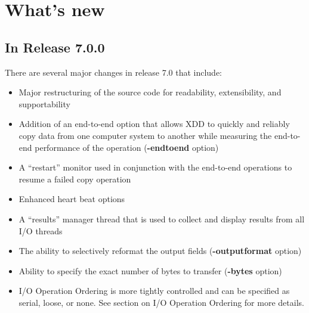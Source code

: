 \newpage
\section{\texorpdfstring{What's new }{What's new }}\label{whats-new}

\subsection{In Release 7.0.0}\label{in-release-7.0.0}

There are several major changes in release 7.0 that include:

\begin{itemize}
\item
  Major restructuring of the source code for readability, extensibility, and supportability
\item
  Addition of an end-to-end option that allows XDD to quickly and reliably copy data from one computer system to another while measuring the end-to-end performance of the operation (\textbf{-endtoend} option)
\item
  A ``restart'' monitor used in conjunction with the end-to-end operations to resume a failed copy operation
\item
  Enhanced heart beat options
\item
  A ``results'' manager thread that is used to collect and display results from all I/O threads
\item
  The ability to selectively reformat the output fields (\textbf{-outputformat} option)
\item
  Ability to specify the exact number of bytes to transfer (\textbf{-bytes} option)
\item
  I/O Operation Ordering is more tightly controlled and can be specified as serial, loose, or none. See section on I/O Operation Ordering for more details.
\end{itemize}

